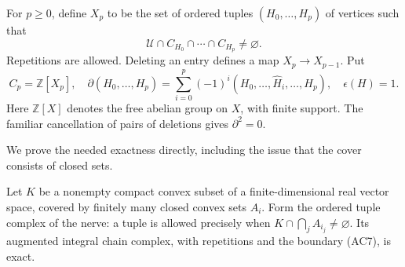 For $p\ge0$, define $X_p$ to be the set of ordered tuples
$(H_0,\ldots,H_p)$ of vertices such that
\[
                   \mathcal U\cap C_{H_0}\cap\cdots
                            \cap C_{H_p}\ne\varnothing.
                   \tag{AC6}
\]
Repetitions are allowed.  Deleting an entry defines a map
$X_p\to X_{p-1}$.  Put
\[
 C_p=\mathbb Z[X_p],\quad
 \partial(H_0,\ldots,H_p)
      =\sum_{i=0}^p(-1)^i(H_0,\ldots,\widehat H_i,\ldots,H_p),
 \quad
 \epsilon(H)=1.
 \tag{AC7}
\]
Here $\mathbb Z[X]$ denotes the free abelian group on $X$,
with finite support.  The familiar cancellation of pairs of
deletions gives $\partial^2=0$.

We prove the needed exactness directly, including the issue
that the cover consists of closed sets.

\begin{lemma}\label{ac-convex-nerve}
Let $K$ be a nonempty compact convex subset of a
finite-dimensional real vector space, covered by finitely many
closed convex sets $A_i$.  Form the ordered tuple complex of
the nerve: a tuple is allowed precisely when
$K\cap\bigcap_j A_{i_j}\ne\varnothing$.  Its augmented integral
chain complex, with repetitions and the boundary (AC7), is exact.
\end{lemma}
